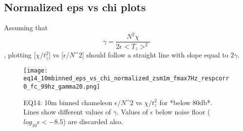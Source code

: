 \documentclass[11pt]{article}
\begin{document}





%    





\clearpage
\subsection{Normalized eps vs chi plots}

Assuming that
\begin{equation}
\gamma=\frac{N^2 \chi}{2\epsilon<T_z>^2}
\end{equation}
, plotting [$\chi/t_{z}^{2}$] vs [$\epsilon/N\^2$] should follow a straight line with slope equal to $2\gamma$.


\begin{figure}[htbp]
\texttt{[image: eq14\_10mbinned\_eps\_vs\_chi\_normalized\_zsm1m\_fmax7Hz\_respcorr0\_fc\_99hz\_gamma20.png]}
\caption{EQ14: 10m binned  chameleon $\epsilon/N\^2$ vs $\chi/t_{z}^{2}$ for *below 80db*. Lines show different values of $\gamma$. Values of $\epsilon$ below noise floor ($log_{10}\epsilon<-8.5$) are discarded also.}
\label{}
\end{figure}
\end{document}
